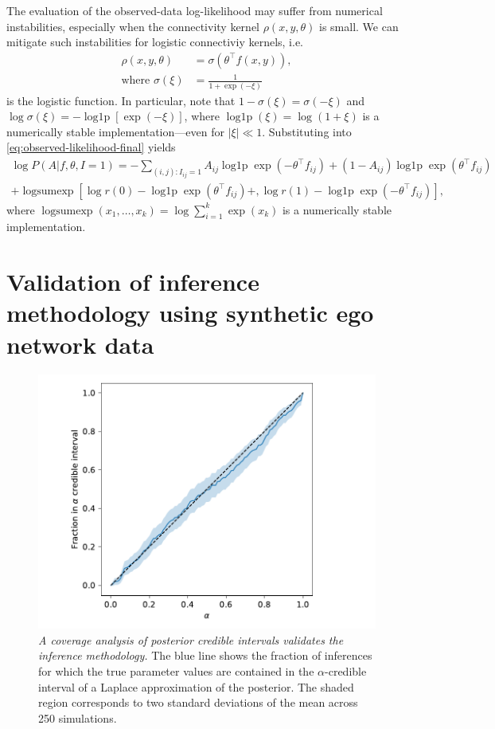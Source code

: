 \documentclass{scrartcl}
\newcommand{\expit}{\sigma}
\newcommand{\transpose}[1]{#1^\intercal}
\DeclareMathOperator{\logp}{log1p}
\DeclareMathOperator{\logsumexp}{logsumexp}
\newcommand{\abs}[1]{\left|#1\right|}
\newcommand{\titlecaption}[2]{\caption[#1]{\emph{#1} #2}}
\begin{document}
\begin{refsection}
The evaluation of the observed-data log-likelihood may suffer from numerical instabilities, especially when the connectivity kernel $\rho(x, y, \theta)$ is small. We can mitigate such instabilities for logistic connectiviy kernels, i.e.
\begin{align}
    \rho(x,y,\theta)&=\expit(\transpose{\theta}f(x,y)),\\
    \text{where }\expit(\xi)&=\frac{1}{1+\exp(-\xi)}
\end{align}
is the logistic function. In particular, note that $1 - \expit(\xi) = \expit(-\xi)$ and $\log\expit(\xi)=-\logp\left[\exp(-\xi)\right]$, where $\logp(\xi)=\log(1 + \xi)$ is a numerically stable implementation---even for $\abs{\xi}\ll 1$. Substituting into \cref{eq:observed-likelihood-final} yields
\begin{multline}
    \log P(A|f,\theta,I=1)= -\sum_{(i,j):I_{ij}=1} A_{ij}\logp\exp\left(-\transpose{\theta}f_{ij}\right)+\left(1-A_{ij}\right)\logp\exp\left(\transpose{\theta}f_{ij}\right) \\
    + \logsumexp\left[\log r(0) - \logp\exp\left(\transpose{\theta}f_{ij}\right) + ,\log r(1)-\logp\exp\left(-\transpose{\theta}f_{ij}\right)\right],
\end{multline}
where $\logsumexp(x_1, \ldots, x_k)=\log\sum_{i=1}^k\exp(x_k)$ is a numerically stable implementation.

\section{Validation of inference methodology using synthetic ego network data\label{app:inference-validation}}

\begin{figure}
    \includegraphics{credible-coverage}
    \titlecaption{A coverage analysis of posterior credible intervals validates the inference methodology.}{The blue line shows the fraction of inferences for which the true parameter values are contained in the $\alpha$-credible interval of a Laplace approximation of the posterior. The shaded region corresponds to two standard deviations of the mean across 250 simulations.\label{fig:credible-coverage}}
\end{figure}


\end{refsection}
\end{document}
